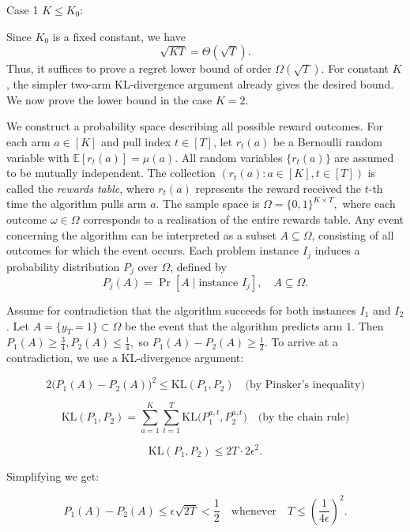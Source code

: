 \documentclass[12pt]{article}
\begin{document}
\vspace{5mm}

\noindent Case 1 $K \leq K_0$: 



\noindent Since $K_0$ is a fixed constant, we have
\[
\sqrt{KT} = \Theta(\sqrt{T}).
\]
\noindent Thus, it suffices to prove a regret lower bound of order $\Omega(\sqrt{T})$.  For constant $K$, the simpler two-arm KL-divergence argument already gives the desired bound. We now prove the lower bound in the case $K=2$. 

\vspace{5mm}

\noindent We construct a probability space describing all possible reward outcomes. For each arm $a \in [K]$ and pull index $t \in [T]$, let $r_t(a)$ be a Bernoulli random variable with $\mathbb{E}[r_t(a)] = \mu(a).$ All random variables $\{r_t(a)\}$ are assumed to be mutually independent. The collection $(r_t(a) : a \in [K], t \in [T])$ is called the \emph{rewards table}, where $r_t(a)$ represents the reward received the $t$-th time the algorithm pulls arm $a$. The sample space is $\Omega = \{0,1\}^{K \times T},$ where each outcome $\omega \in \Omega$ corresponds to a realisation of the entire rewards table. Any event concerning the algorithm can be interpreted as a subset $A \subseteq \Omega$, consisting of all outcomes for which the event occurs. Each problem instance $I_j$ induces a probability distribution $P_j$ over $\Omega$, defined by
\[
P_j(A) = \Pr[A \mid \text{instance } I_j], \quad A \subseteq \Omega .
\]

\noindent Assume for contradiction that the algorithm succeeds for both instances $I_1$ and $I_2$. Let $A = \{y_T = 1\} \subset \Omega$ be the event that the algorithm predicts arm $1$. Then $P_1(A) \ge \frac{3}{4}, P_2(A) \le \frac{1}{4},$ so $P_1(A) - P_2(A) \ge \frac{1}{2}.$ To arrive at a contradiction, we use a KL-divergence argument:

\[
2 \bigl(P_1(A) - P_2(A)\bigr)^2 \le \mathrm{KL}(P_1, P_2) \quad \text{(by Pinsker's inequality)}
\]

\[
\mathrm{KL}(P_1, P_2) = \sum_{a=1}^{K} \sum_{t=1}^{T} \mathrm{KL}\bigl(P_1^{a,t}, P_2^{a,t}\bigr) \quad \text{(by the chain rule)}
\]

\[
\mathrm{KL}(P_1, P_2) \le 2T \cdot 2\epsilon^2.
\]

\noindent Simplifying we get:

\[
P_1(A) - P_2(A) \le \epsilon \sqrt{2T} < \frac{1}{2} \quad \text{whenever} \quad T \le \left(\frac{1}{4\epsilon}\right)^2.
\]
\end{document}
